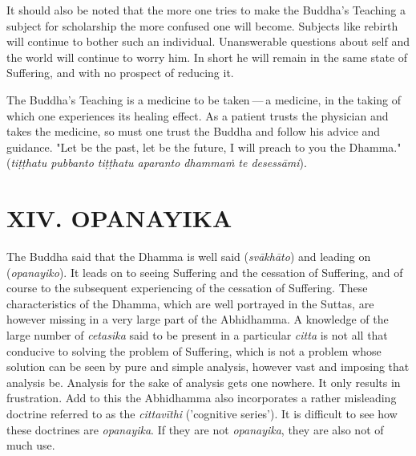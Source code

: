 It should also be noted that the more one tries to make the Buddha’s
Teaching a subject for scholarship the more confused one will become.
Subjects like rebirth will continue to bother such an individual.
Unanswerable questions about self and the world will continue to worry
him. In short he will remain in the same state of Suffering, and with no
prospect of reducing it.


The Buddha’s Teaching is a medicine to be taken — a medicine, in the
taking of which one experiences its healing effect. As a patient trusts
the physician and takes the medicine, so must one trust the Buddha and
follow his advice and guidance. "Let be the past, let be the future, I
will preach to you the Dhamma." (\emph{tiṭṭhatu pubbanto tiṭṭhatu aparanto dhammaṁ te desessāmi}).


\hypertarget{x-xiv.-opanayika}{\section*{XIV. OPANAYIKA}}
The Buddha said that the Dhamma is well said (\emph{svākhāto}) and leading on
(\emph{opanayiko}). It leads on to seeing Suffering and the cessation of
Suffering, and of course to the subsequent experiencing of the cessation
of Suffering. These characteristics of the Dhamma, which are well
portrayed in the Suttas, are however missing in a very large part of the
Abhidhamma. A knowledge of the large number of \emph{cetasika} said to be
present in a particular \emph{citta} is not all that conducive to solving the
problem of Suffering, which is not a problem whose solution can be seen
by pure and simple analysis, however vast and imposing that analysis be.
Analysis for the sake of analysis gets one nowhere. It only results in
frustration. Add to this the Abhidhamma also incorporates a rather
misleading doctrine referred to as the \emph{cittavīthi} ('cognitive series').
It is difficult to see how these doctrines are \emph{opanayika}. If they are not
\emph{opanayika}, they are also not of much use.



